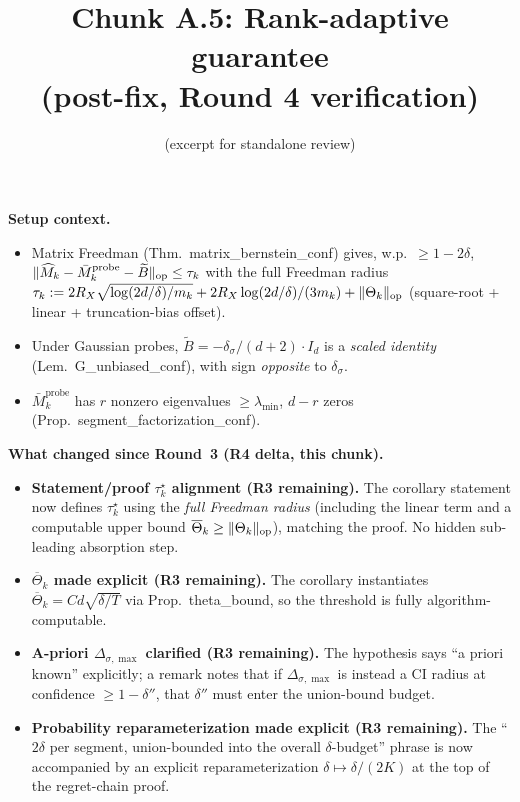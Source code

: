 

\title{Chunk A.5: Rank-adaptive guarantee\\(post-fix, Round 4 verification)}
\author{(excerpt for standalone review)}
\date{}


\maketitle

\textbf{Setup context.}
\begin{itemize}[leftmargin=*,itemsep=1pt,topsep=1pt]
\item Matrix Freedman (Thm.\ matrix\_bernstein\_conf) gives, w.p.\ $\ge 1-2\delta$,
$\|\widehat M_k-\bar M_k^{\mathrm{probe}}-\widetilde B\|_{\mathrm{op}}\le\tau_k$
with the full Freedman radius
$\tau_k:=2R_X\sqrt{\log(2d/\delta)/m_k}+2R_X\log(2d/\delta)/(3m_k)+\|\Theta_k\|_{\mathrm{op}}$
(square-root + linear + truncation-bias offset).
\item Under Gaussian probes, $\widetilde B=-\delta_\sigma/(d+2)\cdot I_d$
is a \emph{scaled identity} (Lem.\ G\_unbiased\_conf), with sign
\emph{opposite} to $\delta_\sigma$.
\item $\bar M_k^{\mathrm{probe}}$ has $r$ nonzero eigenvalues $\ge\lambda_{\min}$,
$d-r$ zeros (Prop.\ segment\_factorization\_conf).
\end{itemize}

\textbf{What changed since Round~3 (R4 delta, this chunk).}
\begin{itemize}[leftmargin=*,itemsep=1pt,topsep=1pt]
\item \textbf{Statement/proof $\tau_k^\star$ alignment (R3 remaining).}
The corollary statement now defines $\tau_k^\star$ using the \emph{full
Freedman radius} (including the linear term and a computable upper bound
$\overline\Theta_k\ge\|\Theta_k\|_{\mathrm{op}}$), matching the proof. No hidden
sub-leading absorption step.
\item \textbf{$\overline\Theta_k$ made explicit (R3 remaining).} The
corollary instantiates $\overline\Theta_k = Cd\sqrt{\delta/T}$ via
Prop.\ theta\_bound, so the threshold is fully algorithm-computable.
\item \textbf{A-priori $\Delta_{\sigma,\max}$ clarified (R3 remaining).}
The hypothesis says ``a priori known'' explicitly; a remark notes
that if $\Delta_{\sigma,\max}$ is instead a CI radius at confidence
$\ge 1-\delta''$, that $\delta''$ must enter the union-bound budget.
\item \textbf{Probability reparameterization made explicit (R3 remaining).}
The ``$2\delta$ per segment, union-bounded into the overall $\delta$-budget''
phrase is now accompanied by an explicit reparameterization
$\delta\mapsto\delta/(2K)$ at the top of the regret-chain proof.
\end{itemize}

